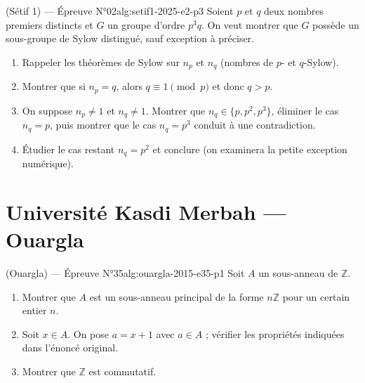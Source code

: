 \newpage

\begin{problem}{(Sétif 1) — Épreuve N°02}{alg:setif1-2025-e2-p3}
Soient $p$ et $q$ deux nombres premiers distincts et $G$ un groupe d'ordre $p^3q$.
On veut montrer que $G$ possède un sous-groupe de Sylow distingué, sauf exception à
préciser.
\begin{enumerate}
\item Rappeler les théorèmes de Sylow sur $n_p$ et $n_q$ (nombres de $p$- et
      $q$-Sylow).
\item Montrer que si $n_p=q$, alors $q\equiv 1 \pmod p$ et donc $q>p$.
\item On suppose $n_p\neq 1$ et $n_q\neq 1$. Montrer que $n_q\in\{p,p^2,p^3\}$,
      éliminer le cas $n_q=p$, puis montrer que le cas $n_q=p^3$ conduit à une
      contradiction.
\item Étudier le cas restant $n_q=p^2$ et conclure (on examinera la petite exception
      numérique).
\end{enumerate}

\end{problem}

\newpage

\section{Université Kasdi Merbah --- Ouargla}

\begin{problem}{(Ouargla) — Épreuve N°35}{alg:ouargla-2015-e35-p1}
Soit $A$ un sous-anneau de $\mathbb{Z}$.
\begin{enumerate}
\item Montrer que $A$ est un sous-anneau principal de la forme $n\mathbb{Z}$ pour un
      certain entier $n$.
\item Soit $x\in A$. On pose $a=x+1$ avec $a\in A$ ; vérifier les propriétés
      indiquées dans l'énoncé original.
\item Montrer que $\mathbb{Z}$ est commutatif.
\end{enumerate}

\end{problem}

